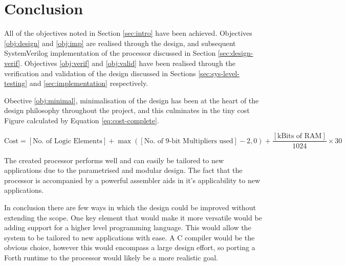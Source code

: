 \section{Conclusion}
All of the objectives noted in Section \ref{sec:intro} have been achieved. Objectives \ref{obj:design} and \ref{obj:imp} are realised through the design, and subsequent SystemVerilog implementation of the processor discussed in Section \ref{sec:design-verif}. Objectives \ref{obj:verif} and \ref{obj:valid} have been realised through the verification and validation of the design discussed in Sections \ref{sec:sys-level-testing} and \ref{sec:implementation} respectively.

Obective \ref{obj:minimal}, minimalisation of the design has been at the heart of the design philosophy throughout the project, and this culminates in the tiny cost Figure calculated by Equation \ref{eq:cost-complete}.

\begin{equation}
\text{Cost} = [\text{No. of Logic Elements}] + \max([\text{No. of 9-bit Multipliers used}] -2, 0) + \frac{ [\text{kBits of RAM}]}{1024} \times 30
\label{eq:cost-complete}
\end{equation}

The created processor performs well and can easily be tailored to new applications due to the parametrised and modular design. The fact that the processor is accompanied by a powerful assembler aids in it's applicability to new applications.

In conclusion there are few ways in which the design could be improved without extending the scope. One key element that would make it more versatile would be adding support for a higher level programming language. This would allow the system to be tailored to new applications with ease. A C compiler would be the obvious choice, however this would encompass a large design effort, so porting a Forth runtime to the processor would likely be a more realistic goal.
